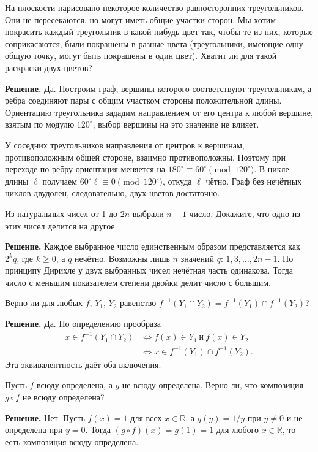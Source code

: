 \begin{problems}
\item На плоскости нарисовано некоторое количество равносторонних треугольников. Они не пересекаются, но могут иметь общие участки сторон. Мы хотим покрасить каждый треугольник в какой-нибудь цвет так, чтобы те из них, которые соприкасаются, были покрашены в разные цвета (треугольники, имеющие одну общую точку, могут быть покрашены в один цвет). Хватит ли для такой раскраски двух цветов?
\par\smallskip\noindent\textbf{Решение.} Да. Построим граф, вершины которого соответствуют треугольникам, а рёбра соединяют пары с общим участком стороны положительной длины. Ориентацию треугольника зададим направлением от его центра к любой вершине, взятым по модулю $120^\circ$; выбор вершины на это значение не влияет.
\par У соседних треугольников направления от центров к вершинам, противоположным общей стороне, взаимно противоположны. Поэтому при переходе по ребру ориентация меняется на $180^\circ\equiv60^\circ\pmod{120^\circ}$. В цикле длины $\ell$ получаем $60^\circ\ell\equiv0\pmod{120^\circ}$, откуда $\ell$ чётно. Граф без нечётных циклов двудолен, следовательно, двух цветов достаточно.\par

\item Из натуральных чисел от 1 до $2n$ выбрали $n+1$ число. Докажите, что одно из этих чисел делится на другое.
\par\smallskip\noindent\textbf{Решение.} Каждое выбранное число единственным образом представляется как $2^kq$, где $k\ge0$, а $q$ нечётно. Возможны лишь $n$ значений $q$: $1,3,\ldots,2n-1$. По принципу Дирихле у двух выбранных чисел нечётная часть одинакова. Тогда число с меньшим показателем степени двойки делит число с большим.\par

\item Верно ли для любых $f$, $Y_1$, $Y_2$ равенство $f^{-1}(Y_1\cap Y_2)=f^{-1}(Y_1)\cap f^{-1}(Y_2)$?
\par\smallskip\noindent\textbf{Решение.} Да. По определению прообраза
\[
\begin{aligned}
x\in f^{-1}(Y_1\cap Y_2)
&\iff f(x)\in Y_1\ \text{и}\ f(x)\in Y_2\\
&\iff x\in f^{-1}(Y_1)\cap f^{-1}(Y_2).
\end{aligned}
\]
Эта эквивалентность даёт оба включения.\par

\item Пусть $f$ всюду определена, а $g$ не всюду определена. Верно ли, что композиция $g\circ f$ не всюду определена?
\par\smallskip\noindent\textbf{Решение.} Нет. Пусть $f(x)=1$ для всех $x\in\mathbb R$, а $g(y)=1/y$ при $y\ne0$ и не определена при $y=0$. Тогда $(g\circ f)(x)=g(1)=1$ для любого $x\in\mathbb R$, то есть композиция всюду определена.\par


\end{problems}
